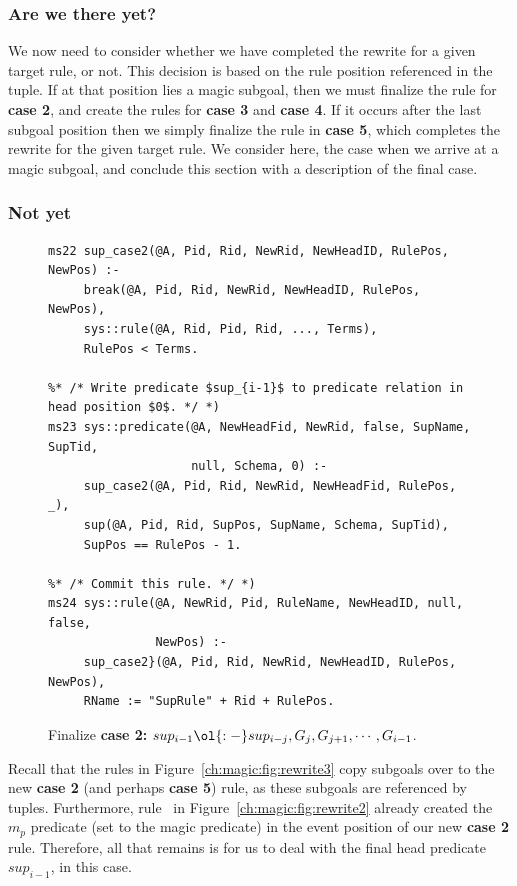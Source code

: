 \subsubsection{Are we there yet?}

We now need to consider whether we have completed the rewrite for a given
target rule, or not.  This decision is based on the rule position referenced in
the  tuple.  If at that position lies a magic subgoal, then we must
finalize the rule for {\bf case 2}, and create the rules for {\bf case 3}
and {\bf case 4}.  If it occurs after the last subgoal position then we simply
finalize the rule in {\bf case 5}, which completes the rewrite for the given
target rule.  We consider here, the case when we arrive at a magic subgoal, and
conclude this section with a description of the final case.

\subsubsection{Not yet}

\begin{figure}[!t]
\ssp
\centering
\begin{lstlisting}
ms22 sup_case2(@A, Pid, Rid, NewRid, NewHeadID, RulePos, NewPos) :-
     break(@A, Pid, Rid, NewRid, NewHeadID, RulePos, NewPos),
     sys::rule(@A, Rid, Pid, Rid, ..., Terms),
     RulePos < Terms.

%* /* Write predicate $sup_{i-1}$ to predicate relation in head position $0$. */ *)
ms23 sys::predicate(@A, NewHeadFid, NewRid, false, SupName, SupTid, 
                    null, Schema, 0) :-
     sup_case2(@A, Pid, Rid, NewRid, NewHeadFid, RulePos, _),
     sup(@A, Pid, Rid, SupPos, SupName, Schema, SupTid),
     SupPos == RulePos - 1.
  
%* /* Commit this rule. */ *)
ms24 sys::rule(@A, NewRid, Pid, RuleName, NewHeadID, null, false, 
               NewPos) :-
     sup_case2}(@A, Pid, Rid, NewRid, NewHeadID, RulePos, NewPos),
     RName := "SupRule" + Rid + RulePos.
\end{lstlisting}
\caption{\label{ch:magic:fig:rewrite5} 
Finalize {\bf case 2:} $sup_{i-1} \ol{:-} sup_{i-j}, G_j, G_{j+1}, \cdots, G_{i-1}$.}
\end{figure}

Recall that the rules in Figure~\ref{ch:magic:fig:rewrite3} copy subgoals over
to the new {\bf case 2} (and perhaps {\bf case 5}) rule, as these subgoals are
referenced by  tuples.  Furthermore, rule~ in
Figure~\ref{ch:magic:fig:rewrite2} already created the $m_p$ predicate (set to
the magic predicate) in the event position of our new {\bf case 2} rule.
Therefore, all that remains is for us to deal with the final head predicate
$sup_{i-1}$, in this case.

